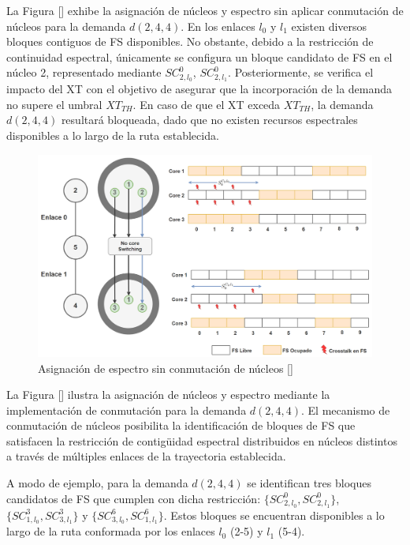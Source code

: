 La Figura [] exhibe la asignación de núcleos y espectro sin aplicar conmutación de núcleos para la demanda $d(2,4,4)$. En los enlaces $l_0$ y $l_1$ existen diversos bloques contiguos de FS disponibles. No obstante, debido a la restricción de continuidad espectral, únicamente se configura un bloque candidato de FS en el núcleo 2, representado mediante $SC_{2,l_0}^0$, $SC_{2,l_1}^0$. Posteriormente, se verifica el impacto del XT con el objetivo de asegurar que la incorporación de la demanda no supere el umbral $XT_{TH}$. En caso de que el XT exceda $XT_{TH}$, la demanda $d(2,4,4)$ resultará bloqueada, dado que no existen recursos espectrales disponibles a lo largo de la ruta establecida.


\begin{figure}[H]
    \centering
    \includegraphics[width=1\textwidth]{capitulos/img/ASIGNACION_ESPECTRO_SIN_CONMMUTACION.png}
    \caption{  Asignación de espectro sin conmutación de núcleos []}
    \label{fig:ASIGNACION_ESPECTRO_SIN_CONMMUTACION}
\end{figure}


La Figura [] ilustra la asignación de núcleos y espectro mediante la implementación de conmutación para la demanda $d(2,4,4)$. El mecanismo de conmutación de núcleos posibilita la identificación de bloques de FS que satisfacen la restricción de contigüidad espectral distribuidos en núcleos distintos a través de múltiples enlaces de la trayectoria establecida.

A modo de ejemplo, para la demanda $d(2,4,4)$ se identifican tres bloques candidatos de FS que cumplen con dicha restricción: $\{SC_{2,l_0}^0, SC_{2,l_1}^0\}$, $\{SC_{1,l_0}^3, SC_{3,l_1}^3\}$ y $\{SC_{3,l_0}^6, SC_{1,l_1}^6\}$. Estos bloques se encuentran disponibles a lo largo de la ruta conformada por los enlaces $l_0$ (2-5) y $l_1$ (5-4).

